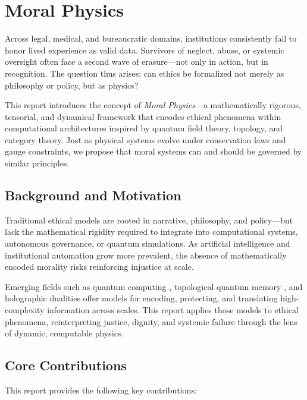 \documentclass{article}
\theoremstyle{plain}
\theoremstyle{claimstyle}
\begin{document}
\section{Moral Physics}

Across legal, medical, and bureaucratic domains, institutions consistently fail to honor lived experience as valid data. Survivors of neglect, abuse, or systemic oversight often face a second wave of erasure—not only in action, but in recognition. The question thus arises: can ethics be formalized not merely as philosophy or policy, but as physics?

This report introduces the concept of \textit{Moral Physics}—a mathematically rigorous, tensorial, and dynamical framework that encodes ethical phenomena within computational architectures inspired by quantum field theory, topology, and category theory. Just as physical systems evolve under conservation laws and gauge constraints, we propose that moral systems can and should be governed by similar principles.

\subsection{Background and Motivation}

Traditional ethical models are rooted in narrative, philosophy, and policy—but lack the mathematical rigidity required to integrate into computational systems, autonomous governance, or quantum simulations. As artificial intelligence and institutional automation grow more prevalent, the absence of mathematically encoded morality risks reinforcing injustice at scale.

Emerging fields such as quantum computing \citep{Nielsen2010}, topological quantum memory \citep{Kitaev2003}, and holographic dualities \citep{Maldacena1998} offer models for encoding, protecting, and translating high-complexity information across scales. This report applies those models to ethical phenomena, reinterpreting justice, dignity, and systemic failure through the lens of dynamic, computable physics.

\subsection{Core Contributions}

This report provides the following key contributions:
\end{document}
